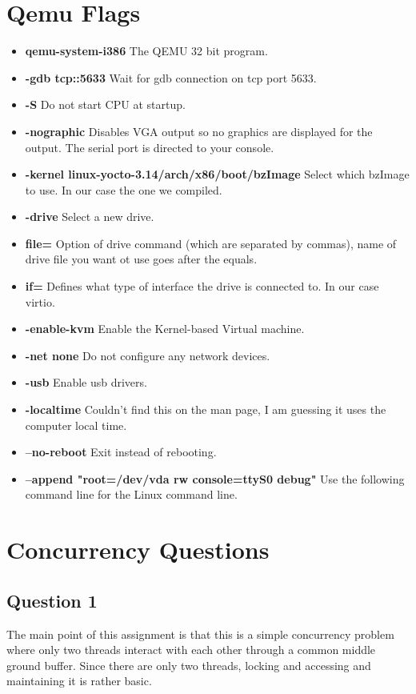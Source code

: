 \documentclass[10pt,draftclsnofoot,onecolumn, compsoc]{IEEEtran}
\begin{document}
\section{Qemu Flags}
\begin{itemize}
	\item {\bf qemu-system-i386}  The QEMU 32 bit program.
	\item {\bf -gdb tcp::5633}  Wait for gdb connection on tcp port 5633.
	\item {\bf -S} Do not start CPU at startup.
	\item {\bf -nographic} Disables VGA output so no graphics are displayed for the output. The serial port is directed to your console.
	\item {\bf -kernel linux-yocto-3.14/arch/x86/boot/bzImage} Select which bzImage to use. In our case the one we compiled.
	\item {\bf -drive} Select a new drive.
	\item {\bf file=} Option of drive command (which are separated by commas), name of drive file you want ot use goes after the equals.
	\item {\bf if=} Defines what type of interface the drive is connected to. In our case virtio.
	\item {\bf -enable-kvm} Enable the Kernel-based Virtual machine.
	\item {\bf -net none} Do not configure any network devices.
	\item {\bf -usb} Enable usb drivers.
	\item {\bf -localtime} Couldn't find this on the man page, I am guessing it uses the computer local time.
	\item {\bf --no-reboot} Exit instead of rebooting.
	\item {\bf --append "root=/dev/vda rw console=ttyS0 debug"} Use the following command line for the Linux command line. 
\end{itemize}

\section{Concurrency Questions}
\subsection{Question 1}
The main point of this assignment is that this is a simple concurrency problem where only two threads interact with each other through a common middle ground buffer. Since there are only two threads, locking and accessing and maintaining it is rather basic. 
\end{document}
